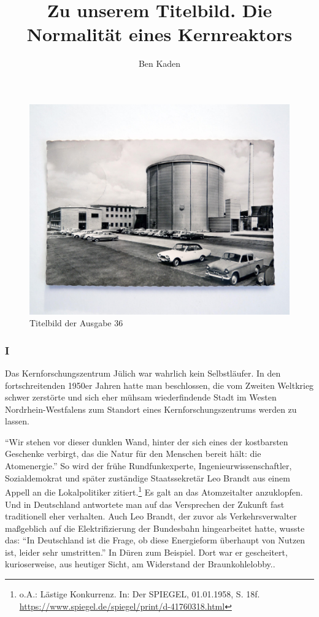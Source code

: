 \documentclass[a4paper,
fontsize=11pt,
oneside,
numbers=noperiodatend,
parskip=half-,
bibliography=totoc,
final
]{scrartcl}
\title{\LARGE{Zu unserem Titelbild. Die Normalität eines Kernreaktors}}
\author{Ben Kaden} %
\date{}
\begin{document}
\maketitle
\thispagestyle{fancyplain} 


\begin{figure}[h!]
\centering
\includegraphics{cover.png}
\caption{Titelbild der Ausgabe 36}
\end{figure}

\hypertarget{i}{%
\subsubsection{I}\label{i}}

Das Kernforschungszentrum Jülich war wahrlich kein Selbstläufer. In den
fortschreitenden 1950er Jahren hatte man beschlossen, die vom Zweiten
Weltkrieg schwer zerstörte und sich eher mühsam wiederfindende Stadt im
Westen Nordrhein-Westfalens zum Standort eines Kernforschungszentrums
werden zu lassen.

\enquote{Wir stehen vor dieser dunklen Wand, hinter der sich eines der
kostbarsten Geschenke verbirgt, das die Natur für den Menschen bereit
hält: die Atomenergie.} So wird der frühe Rundfunkexperte,
Ingenieurwissenschaftler, Sozialdemokrat und später zuständige
Staatssekretär Leo Brandt aus einem Appell an die Lokalpolitiker
zitiert.\footnote{o.A.: Lästige Konkurrenz. In: Der SPIEGEL, 01.01.1958,
  S. 18f. \url{https://www.spiegel.de/spiegel/print/d-41760318.html}} Es
galt an das Atomzeitalter anzuklopfen. Und in Deutschland antwortete man
auf das Versprechen der Zukunft fast traditionell eher verhalten. Auch
Leo Brandt, der zuvor als Verkehrsverwalter maßgeblich auf die
Elektrifizierung der Bundesbahn hingearbeitet hatte, wusste das:
\enquote{In Deutschland ist die Frage, ob diese Energieform überhaupt
von Nutzen ist, leider sehr umstritten.} In Düren zum Beispiel. Dort war
er gescheitert, kurioserweise, aus heutiger Sicht, am Widerstand der
Braunkohlelobby..
\end{document}

